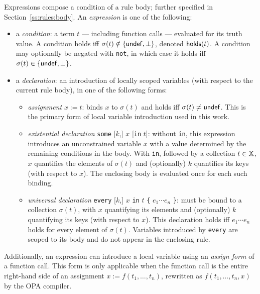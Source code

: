 Expressions compose a condition of a rule body; further specified in Section~\ref{ss:rules:body}.
An \emph{expression} is one of the following:
\begin{itemize}
  \item a \emph{condition}: a term $t$ — including function calls — evaluated for its truth value.
        A condition holds iff $\sigma(t) \notin \{\mathsf{undef}, \bot\}$, denoted $\mathsf{holds}(t)$.
        A condition may optionally be negated with \texttt{not}, in which case it holds iff $\sigma(t) \in \{\mathsf{undef}, \bot\}$.
  \item a \emph{declaration}: an introduction of locally scoped variables (with respect to the current rule body), in one of the following forms:
    \begin{itemize}
      \item \emph{assignment} $x \mathrel{:=} t$: binds $x$ to $\sigma(t)$ and holds iff $\sigma(t) \neq \mathsf{undef}$.
            This is the primary form of local variable introduction used in this work.
      \item \emph{existential declaration} \texttt{some} [$k$,] $x$ [\texttt{in} $t$]:
            without \texttt{in}, this expression introduces an unconstrained variable $x$ with a value determined by the remaining conditions in the body.
            With \texttt{in}, followed by a collection $t \in \mathbb{X}$, $x$ quantifies the elements of $\sigma(t)$ and (optionally) $k$ quantifies its keys (with respect to $x$).
            The enclosing body is evaluated once for each such binding.
      \item \emph{universal declaration} \texttt{every} [$k$,] $x$ \texttt{in} $t$ \texttt{\{} $e_1 \cdots e_n$ \texttt{\}}:
            must be bound to a collection $\sigma(t)$, with $x$ quantifying its elements and (optionally) $k$ quantifying its keys (with respect to $x$).
            This declaration holds iff $e_1 \cdots e_n$ holds for every element of $\sigma(t)$.
            Variables introduced by \texttt{every} are scoped to its body and do not appear in the enclosing rule.
    \end{itemize}
\end{itemize}

Additionally, an expression can introduce a local variable using an \emph{assign form} of a function call.
This form is only applicable when the function call is the entire right-hand side of an assignment $x \mathrel{:=} f(t_1, \ldots, t_n)$, rewritten as $f(t_1, \ldots, t_n, x)$ by the OPA compiler.

